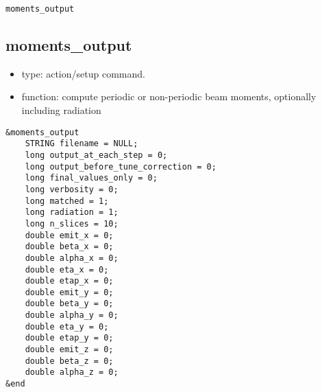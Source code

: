 \documentclass[11pt]{article}
\begin{document}
\begin{latexonly}
\newpage
\begin{center}{\Large\verb|moments_output|}\end{center}
\end{latexonly}
\subsection{moments\_output \label{subsec:momentsoutput}}

\begin{itemize}
\item type: action/setup command.
\item function: compute periodic or non-periodic beam moments, optionally including radiation
\end{itemize}

\begin{verbatim}
&moments_output
    STRING filename = NULL;
    long output_at_each_step = 0;
    long output_before_tune_correction = 0;
    long final_values_only = 0;
    long verbosity = 0;
    long matched = 1;
    long radiation = 1;
    long n_slices = 10;
    double emit_x = 0;
    double beta_x = 0;
    double alpha_x = 0;
    double eta_x = 0;
    double etap_x = 0;
    double emit_y = 0;
    double beta_y = 0;
    double alpha_y = 0;
    double eta_y = 0;
    double etap_y = 0;
    double emit_z = 0;
    double beta_z = 0;
    double alpha_z = 0;
&end
\end{verbatim}
\end{document}
